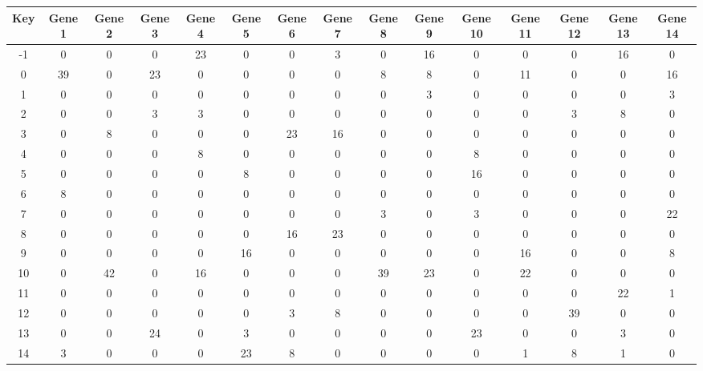 \begin{tabular}{|c|c|c|c|c|c|c|c|c|c|c|c|c|c|c|}
\hline
Key & Gene 1 & Gene 2 & Gene 3 & Gene 4 & Gene 5 & Gene 6 & Gene 7 & Gene 8 & Gene 9 & Gene 10 & Gene 11 & Gene 12 & Gene 13 & Gene 14 \\
\hline
-1 & 0 & 0 & 0 & 23 & 0 & 0 & 3 & 0 & 16 & 0 & 0 & 0 & 16 & 0 \\
0 & 39 & 0 & 23 & 0 & 0 & 0 & 0 & 8 & 8 & 0 & 11 & 0 & 0 & 16 \\
1 & 0 & 0 & 0 & 0 & 0 & 0 & 0 & 0 & 3 & 0 & 0 & 0 & 0 & 3 \\
2 & 0 & 0 & 3 & 3 & 0 & 0 & 0 & 0 & 0 & 0 & 0 & 3 & 8 & 0 \\
3 & 0 & 8 & 0 & 0 & 0 & 23 & 16 & 0 & 0 & 0 & 0 & 0 & 0 & 0 \\
4 & 0 & 0 & 0 & 8 & 0 & 0 & 0 & 0 & 0 & 8 & 0 & 0 & 0 & 0 \\
5 & 0 & 0 & 0 & 0 & 8 & 0 & 0 & 0 & 0 & 16 & 0 & 0 & 0 & 0 \\
6 & 8 & 0 & 0 & 0 & 0 & 0 & 0 & 0 & 0 & 0 & 0 & 0 & 0 & 0 \\
7 & 0 & 0 & 0 & 0 & 0 & 0 & 0 & 3 & 0 & 3 & 0 & 0 & 0 & 22 \\
8 & 0 & 0 & 0 & 0 & 0 & 16 & 23 & 0 & 0 & 0 & 0 & 0 & 0 & 0 \\
9 & 0 & 0 & 0 & 0 & 16 & 0 & 0 & 0 & 0 & 0 & 16 & 0 & 0 & 8 \\
10 & 0 & 42 & 0 & 16 & 0 & 0 & 0 & 39 & 23 & 0 & 22 & 0 & 0 & 0 \\
11 & 0 & 0 & 0 & 0 & 0 & 0 & 0 & 0 & 0 & 0 & 0 & 0 & 22 & 1 \\
12 & 0 & 0 & 0 & 0 & 0 & 3 & 8 & 0 & 0 & 0 & 0 & 39 & 0 & 0 \\
13 & 0 & 0 & 24 & 0 & 3 & 0 & 0 & 0 & 0 & 23 & 0 & 0 & 3 & 0 \\
14 & 3 & 0 & 0 & 0 & 23 & 8 & 0 & 0 & 0 & 0 & 1 & 8 & 1 & 0 \\
\hline
\end{tabular}